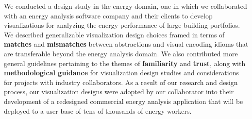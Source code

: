 \documentclass[journal]{vgtc}                %
\newcommand{\tm}[1]{\textcolor{red}{#1}}
\begin{document}
We conducted a design study in the energy domain, one in which we collaborated with an energy analysis software company and their clients to develop visualizations for analyzing the energy performance of large building portfolios.
We described generalizable visualization design choices framed in terms of {\bf matches} and {\bf mismatches} between abstractions and visual encoding idioms that are transferable beyond the energy analysis domain.
We also contributed more general guidelines pertaining to the themes of {\bf familiarity} and {\bf trust}, along with {\bf methodological guidance} for visualization design studies and considerations for projects with industry collaborators.
As a result of our research and design process, our visualization designs were adopted by our collaborator into their development of a redesigned commercial energy analysis application that will be deployed to a user base of tens of thousands of energy workers.





\end{document}
